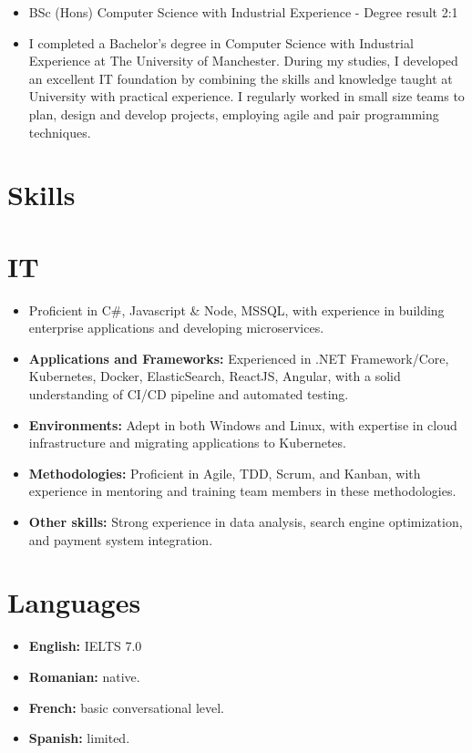 \documentclass[12pt,a4paper]{res}
\begin{document}
\begin{resume}
  \begin{itemize} %
     \item[] BSc (Hons) Computer Science  with Industrial Experience - Degree result 2:1
     \item[] I completed a Bachelor's degree in Computer Science with Industrial Experience at The University of Manchester. During my studies, I developed an excellent IT foundation by combining the skills and knowledge taught at University with practical experience. I regularly worked in small size teams to plan, design and develop projects, employing agile and pair programming techniques.
   \end{itemize}

\section{\large\bf Skills}
\vspace{2mm}
\section{IT}
\vspace{-1mm}
  \begin{itemize}

  \item[] Proficient in C\#, Javascript \& Node, MSSQL, with experience in building enterprise applications and developing microservices.
  \item[] {\bf Applications and Frameworks:} Experienced in .NET Framework/Core, Kubernetes, Docker, ElasticSearch, ReactJS, Angular, with a solid understanding of CI/CD pipeline and automated testing.
  \item[] {\bf Environments:} Adept in both Windows and Linux, with expertise in cloud infrastructure and migrating applications to Kubernetes.
  \item[] {\bf Methodologies:} Proficient in Agile, TDD, Scrum, and Kanban, with experience in mentoring and training team members in these methodologies.
  \item[] {\bf Other skills:} Strong experience in data analysis, search engine optimization, and payment system integration.
  \end{itemize}
\vspace{-3mm}
      
    
\section{Languages}
\vspace{-0.7mm}
\begin{itemize}
\item[] {\bf English:} IELTS 7.0
\item[] {\bf Romanian:} native.
\item[] {\bf French:} basic conversational level.
\item[] {\bf Spanish:} limited. 
\end{itemize}
\vspace{-3mm}


\end{resume}
\end{document}
